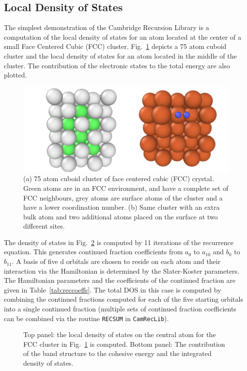\subsection{Local Density of States}
\label{sec:fccldos}
The simplest demonstration of the Cambridge Recursion Library 
is a computation of the local density of states for an atom located at the center of a small 
Face Centered Cubic (FCC) cluster. 
Fig.~\ref{fig:cuboid} depicts a 75 atom cuboid cluster and the 
local density of states for an atom located in the middle of the cluster. 
The contribution of the electronic states to the total energy are also plotted. 
%
\begin{figure}
\begin{center}
\includegraphics[width=\columnwidth]{./invariance/rec_examples/exrecal/combined.png}
\caption{(a) 75 atom cuboid cluster of face centered cubic (FCC) crystal. Green 
atoms are in an FCC environment, and have a complete set of FCC neighbours, grey atoms 
are surface atoms of the cluster and a have a lower coordination number.
(b) Same cluster with an extra bulk atom and two additional atoms 
placed on the surface at two different sites. 
\label{fig:cuboid}}
\end{center}
\end{figure}
%
The density of states in Fig.~\ref{fig:fcc_dos} is computed by 11 iterations of the 
recurrence equation. This generates continued fraction coefficients
from $a_{0}$ to $a_{10}$ and $b_{0}$ to $b_{11}$. 
A basis of five d orbitals are chosen to reside on each atom 
and their interaction via the Hamiltonian is determined by the Slater-Koster parameters.
The Hamiltonian parameters and the coefficients of the continued fraction are given in Table~\ref{tab:reccoeffs}.
The total DOS in this case is computed by combining the continued fractions computed for each of the 
five starting orbitals into a single continued fraction 
(multiple sets of continued fraction coefficients can be combined via the 
routine \texttt{RECSUM} in \texttt{CamRecLib}). 
%
\begin{figure}
\begin{center}
{\graphicspath{{./invariance/rec_examples/exrecal/}}}
\caption{Top panel: the local density of states on the central atom for the FCC 
cluster in Fig.~\ref{fig:cuboid} is computed. 
Bottom panel:  The contribution of the band structure to the 
cohesive energy and the integrated density of states.\label{fig:fcc_dos}}
\end{center}
\end{figure}
%


